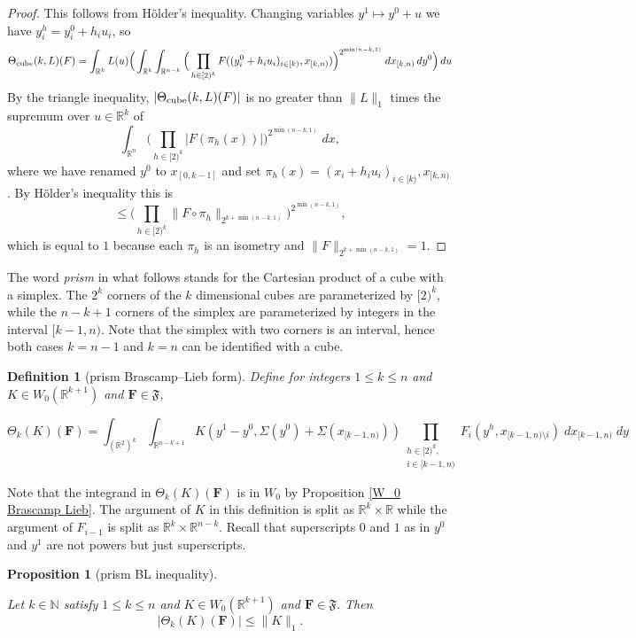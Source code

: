 \documentclass[12pt,reqno]{amsart}
\theoremstyle{plain}
\newtheorem{proposition}[theorem]{Proposition}
\newtheorem{definition}[theorem]{Definition}
\numberwithin{equation}{section}
\theoremstyle{remark}
\newcommand{\R}{{\mathbb R}}
\newcommand{\N}{{\mathbb N}}
\newcommand{\F}{\mathbf{F}}
\begin{document}
\begin{proof}
This follows from H\"older's inequality.
Changing variables $y^1\mapsto y^0 + u$ we have $y^h_i=y^0_i+h_i u_i$, so
\[ \Theta_{{\rm cube}}(k,L)(F) = \int_{\R^k} L(u) \Big(\int_{\R^k}\int_{\R^{n-k}} \Big(\prod_{h\in [2)^k} F((y^0_i+h_i u_i)_{i\in [k)}, x_{[k,n)})\Big)^{2^{\min(n-k,1)}}\;dx_{[k,n)}\,dy^0\Big)\,du \]
By the triangle inequality, $|\Theta_{{\rm cube}}(k,L)(F)|$ is no greater than $\|L\|_1$ times the supremum over $u\in\R^k$ of
\[ \int_{\R^n} \Big(\prod_{h\in [2)^k} |F(\pi_h(x))|\Big)^{2^{\min(n-k,1)}}\;dx, \]
where we have renamed $y^0$ to $x_{[0,k-1]}$
and set $\pi_h(x)=(x_i+h_i u_i)_{i\in [k)}, x_{[k,n)}$. By H\"older's inequality this is
\[ \le \Big(\prod_{h\in [2)^k} \|F\circ \pi_h\|_{2^{k+\min(n-k,1)}}\Big)^{2^{\min(n-k,1)}}, \]
which is equal to $1$ because each $\pi_h$ is an isometry and $\|F\|_{2^{k+\min(n-k,1)}}=1$.
\end{proof}


The word {\em prism} in what follows stands for the Cartesian product of a cube with a simplex.
The $2^k$ corners of the $k$ dimensional cubes are parameterized by $[2)^k$,
while the $n-k+1$ corners of the simplex are
parameterized by integers in the interval $[k-1,n)$.
Note that the simplex with two corners is an interval,
hence both cases $k=n-1$ and $k=n$ can be identified with a cube.


\begin{definition}[prism Brascamp--Lieb form]\label{prism Brascamp--Lieb}
Define for integers $1 \le k\le  n$
and  $K\in W_0(\R^{k+1})$ and $\F\in \mathfrak{F}$,


\begin{equation}\label{auto:K-kernel-form} \Theta_k(K)(\F) = \int_{(\R^{2})^k} \int_{\R^{n-k+1}} K(y^1-y^0, \Sigma(y^0) + \Sigma(x_{[k-1,n)}))
\prod_{\substack{h\in [2)^k,\\i\in [k-1,n)}} F_{i}( y^h, x_{[k-1,n)\setminus i})\;dx_{[k-1,n)}\;dy \end{equation}
\end{definition}

Note that the integrand in $\Theta_k(K)(\F)$ is in $W_0$ by Proposition \ref{W_0 Brascamp Lieb}.
The argument of $K$ in
this definition is split as $\R^{k}\times \R$
while
the argument of $F_{i-1}$  is split as $\R^{k}\times \R^{n-k}$. Recall that superscripts $0$ and $1$ as in $y^0$ and $y^1$ are not powers but just superscripts.

\begin{proposition}[prism BL inequality]\label{prism BL inequality}

Let $k\in\N$ satisfy $1\le k\le n$ and $K\in W_0(\R^{k+1})$ and $\F\in \mathfrak{F}$. Then
\begin{equation}\label{prism-k-bound}
   |\Theta_k(K)(\F)| \le \|K\|_1.
\end{equation}
\end{proposition}
\end{document}
